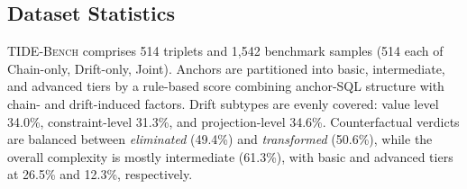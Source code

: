 

\subsection{Dataset Statistics}
\label{sec:dataset-statistics}
\textsc{TIDE-Bench} comprises 514 triplets and 1{,}542 benchmark samples (514 each of Chain-only, Drift-only, Joint). Anchors are partitioned into basic, intermediate, and advanced tiers by a rule-based score combining anchor-SQL structure with chain- and drift-induced factors. Drift subtypes are evenly covered: value level 34.0\%, constraint-level 31.3\%, and projection-level 34.6\%. Counterfactual verdicts are balanced between \emph{eliminated} (49.4\%) and \emph{transformed} (50.6\%), while the overall complexity is mostly intermediate (61.3\%), with basic and advanced tiers at 26.5\% and 12.3\%, respectively.

